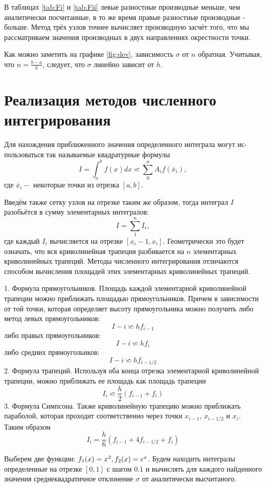 \documentclass{article}
\begin{document}
В таблицах \ref{tab:Fi} и \ref{tab:Fii} левые разностные производные меньше,
чем аналитически посчитанные, в то же время правые разностные производные - больше.
Метод трёх узлов точнее вычисляет производную засчёт того, что мы рассматриваем
значения производных в двух направлениях окрестности точки.

Как можно заметить на графике \ref{fig:dev}, зависимость $\sigma$ от $n$ обратная.
Учитывая, что $n = \frac{b-a}{h}$, следует, что $\sigma$ линейно зависит от $h$.

\section{Реализация методов численного интегрирования}

Для нахождения приближенного значения определенного интеграла могут ис- пользоваться так называемые квадратурные формулы
$$I=\int_a^b f(x)dx\backsimeq \sum_0^n A_i f(\bar x_i),$$
где $\bar x_i-$ некоторые точки из отрезка $[a,b]$.
\vspace{5mm}

Введём также сетку узлов на отрезке таким же образом,
тогда интеграл $I$ разобьётся в сумму элементарных интегралов:
$$I=\sum_1^nI_i,$$
где каждый $I_i$ вычисляется на отрезке $[x_i−1,x_i]$. Геометрически это будет означать, что вся криволинейная трапеция разбивается на $n$ элементарных криволинейных трапеций. Методы численного интегрирования отличаются способом вычисления площадей этих элементарных криволинейных трапеций.

1. Формула прямоугольников. Площадь каждой элементарной криволинейной трапеции можно приближать площадью прямоугольников. Причем в зависимости от той точки, которая определяет высоту прямоугольника можно получить либо метод левых прямоугольников:
$$I-i \backsimeq hf_{i-1}$$
либо правых прямоугольников:
$$I-i \backsimeq hf_{i}$$
либо средних прямоугольнков:
$$I-i \backsimeq hf_{i-1/2}$$
2. Формула трапеций. Используя оба конца отрезка элементарной криволинейной трапеции, можно приближать ее площадь как площадь трапеции
$$I_i \backsimeq \frac{h}{2}(f_{i-1}+f_i)$$
3. Формула Симпсона. Также криволинейную трапецию можно приближать параболой, которая проходит
соответственно через точки $x_{i-1}$, $x_{i-1/2}$ и $x_i$. Таким образом
$$I_i = \frac{h}{6}(f_{i-1} + 4f_{i-1/2}+f_i)$$

Выберем две функции: $f_1(x) = x^2, f_2(x) = e^x$. Будем находить интегралы определенные
на отрезке $[0, 1]$ с шагом $0.1$ и вычислять для каждого найденного значения среднеквадратичное отклонение $\sigma$ от аналитически высчитаного.
\end{document}
